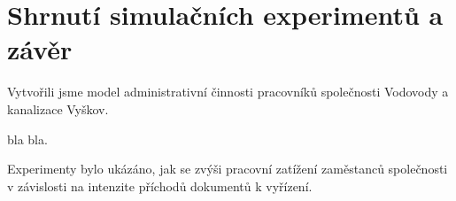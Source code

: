 \documentclass[12pt,a4paper]{article}
\begin{document}

\newpage


\section{Shrnutí simulačních experimentů a závěr}

Vytvořili jsme model administrativní činnosti pracovníků společnosti Vodovody a kanalizace Vyškov.

 bla bla.

Experimenty bylo ukázáno, jak se zvýši pracovní zatížení zaměstanců společnosti v závislosti na intenzite příchodů
dokumentů k vyřízení.


\newpage
\end{document}
